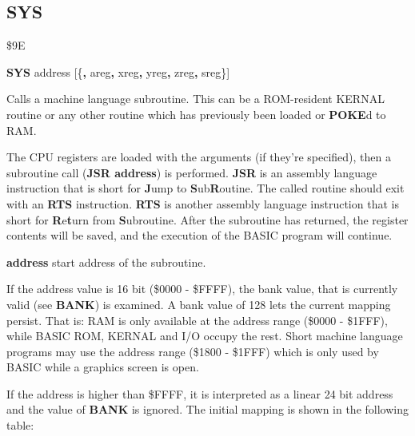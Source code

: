 
\newpage
\subsection{SYS}
\begin{description}[leftmargin=2cm,style=nextline]
\item [Token:] \$9E
\item [Format:] {\bf SYS} address [\{{\bf,} areg{\bf,} xreg{\bf,} yreg{\bf,}
		zreg{\bf,} sreg\}]
\item [Usage:]  Calls a machine language subroutine.
                This can be a ROM-resident KERNAL routine
                or any other routine which has previously been loaded or {\bf POKE}d
                to RAM.

               The CPU registers are loaded with the arguments
               (if they're specified), then a subroutine call ({\bf JSR address})
               is performed. {\bf JSR} is an assembly language instruction that is short
               for {\bf J}ump to {\bf S}ub{\bf R}outine.
               The called routine should exit with
               an {\bf RTS} instruction. {\bf RTS} is another assembly
               language instruction that is
               short for {\bf R}e{\bf t}urn from {\bf S}ubroutine.
               After the subroutine has returned,
               the register contents will be saved,
               and the execution of the BASIC program will
               continue.

               {\bf address} start address of the subroutine.

               If the address value is 16 bit (\$0000 - \$FFFF), the bank value,
               that is currently valid (see {\bf BANK}) is examined. A
               bank value of 128 lets the current mapping persist. That is:
               RAM is only available at the address range (\$0000 - \$1FFF),
               while BASIC ROM, KERNAL and I/O occupy the rest.
               Short machine language programs may use the address range
               (\$1800 - \$1FFF) which is only used by BASIC while a
               graphics screen is open.

               If the address is higher than \$FFFF, it is interpreted as a
               linear 24 bit address and the value of {\bf BANK} is ignored.
               The initial mapping is shown in the following table:


\end{description}
